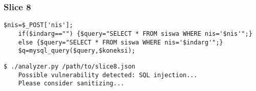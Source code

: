 \subsubsection*{Slice 8}
\label{sec:experimental.examples.slice08}

\begin{lstlisting}[label={php.slice08},
        title={slice8.php}]
    $nis=$_POST['nis'];
    if($indarg=="") {$query="SELECT * FROM siswa WHERE nis='$nis'";}
    else {$query="SELECT * FROM siswa WHERE nis='$indarg'";}
    $q=mysql_query($query,$koneksi);
\end{lstlisting}

\begin{lstlisting}[label={out.example.slice08},
        caption={Shortened example SQLI vulnerable slice analysis output}]
    $ ./analyzer.py /path/to/slice8.json
    Possible vulnerability detected: SQL injection...
    Please consider sanitizing...
\end{lstlisting}
